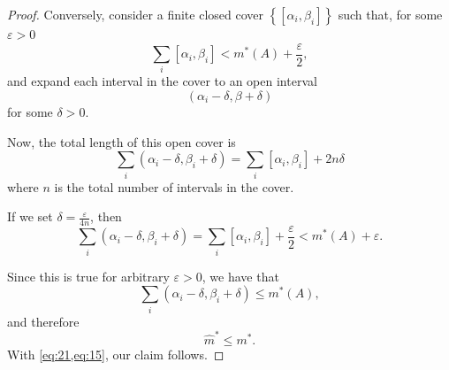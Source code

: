 \documentclass[12pt]{article}
\newenvironment{problem}[2][Problem]{\begin{trivlist}
    \item[\hskip \labelsep {\bfseries #1}\hskip \labelsep {\bfseries #2.}]}{\end{trivlist}}
\theoremstyle{definition}
\begin{document}
\begin{problem}{1}
\begin{enumerate}[label=(\roman*)]
\begin{proof}
          Conversely, consider a finite closed cover \( \left\{ [\alpha_i, \beta_i] \right\} \) such that, for some \(\varepsilon > 0\)
          \begin{equation}
          \label{eq:16}
          \sum\limits_i [\alpha_i, \beta_i] < m^{*}(A) + \frac{\varepsilon}{2},
          \end{equation}
          and expand each interval in the cover to an open interval
          \begin{equation}
          \label{eq:17}
          \left( \alpha_i - \delta, \beta + \delta \right)
          \end{equation}
          for some \(\delta > 0\).

          Now, the total length of this open cover is
          \begin{equation}
          \label{eq:18}
          \sum\limits_i (\alpha_i - \delta, \beta_i + \delta) = \sum\limits_i [\alpha_i, \beta_i] + 2n\delta
          \end{equation}
          where \(n\) is the total number of intervals in the cover.

          If we set \( \delta = \frac{\varepsilon}{4n} \), then
          \begin{equation}
          \label{eq:19}
          \sum\limits_i (\alpha_i - \delta, \beta_i + \delta) = \sum\limits_i [\alpha_i, \beta_i] + \frac{\varepsilon}{2} < m^{*}(A) + \varepsilon.
          \end{equation}

          Since this is true for arbitrary \(\varepsilon > 0\), we have that
          \begin{equation}
          \label{eq:20}
          \sum\limits_i (\alpha_i - \delta, \beta_i + \delta) \leq m^{*}(A),
          \end{equation}
          and therefore
          \begin{equation}
          \label{eq:21}
          \hat{m}^{*} \leq m^{*}.
          \end{equation}
          With \cref{eq:21,eq:15}, our claim follows.
          \end{proof}
  \end{enumerate}
\end{problem}
\end{document}
